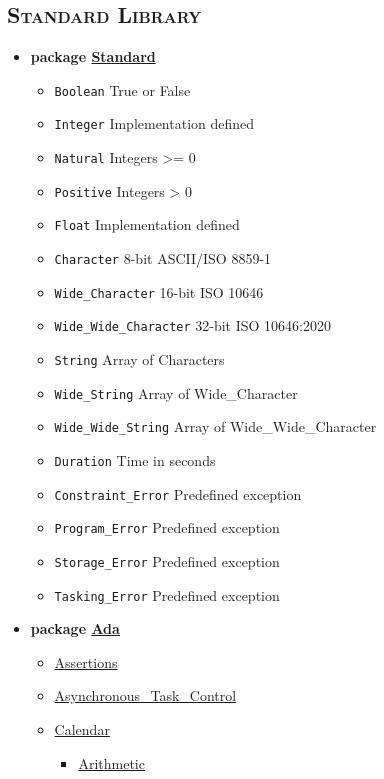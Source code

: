 \begin{multicols*}{\columnnr}
\begin{scriptsize}
\section*{\textsc{Standard Library}}
\begin{itemize}[leftmargin=0mm]
\item[] \textbf{package \href{\adarmlink{RM-A-1.html}}{Standard}}
  \begin{itemize}[leftmargin=5mm]
  \item[] \texttt{Boolean} True or False
  \item[] \texttt{Integer} Implementation defined
  \item[] \texttt{Natural} Integers >= 0
  \item[] \texttt{Positive} Integers > 0
  \item[] \texttt{Float} Implementation defined
  \item[] \texttt{Character} 8-bit ASCII/ISO 8859-1
  \item[] \texttt{Wide\_Character} 16-bit ISO 10646
  \item[] \texttt{Wide\_Wide\_Character} 32-bit ISO 10646:2020
  \item[] \texttt{String} Array of Characters
  \item[] \texttt{Wide\_String} Array of Wide\_Character
  \item[] \texttt{Wide\_Wide\_String} Array of Wide\_Wide\_Character
  \item[] \texttt{Duration} Time in seconds
  \item[] \texttt{Constraint\_Error} Predefined exception
  \item[] \texttt{Program\_Error} Predefined exception
  \item[] \texttt{Storage\_Error} Predefined exception
  \item[] \texttt{Tasking\_Error} Predefined exception
  \end{itemize}
\item[] \textbf{package \href{\adarmlink{RM-A-2.html}}{Ada}}
  \begin{itemize}[leftmargin=5mm]
  \item[] \href{\adarmlink{RM-11-4-2.html}}{Assertions}
  \item[] \href{\adarmlink{RM-D-11.html}}{Asynchronous\_Task\_Control}
  \item[] \href{\adarmlink{RM-9-6.html}}{Calendar}
	\begin{itemize}[leftmargin=5mm]
	\item[] \href{\adarmlink{RM-9-6-1.html}}{Arithmetic}

\end{itemize}
\end{itemize}
\end{itemize}
\end{scriptsize}
\end{multicols*}
